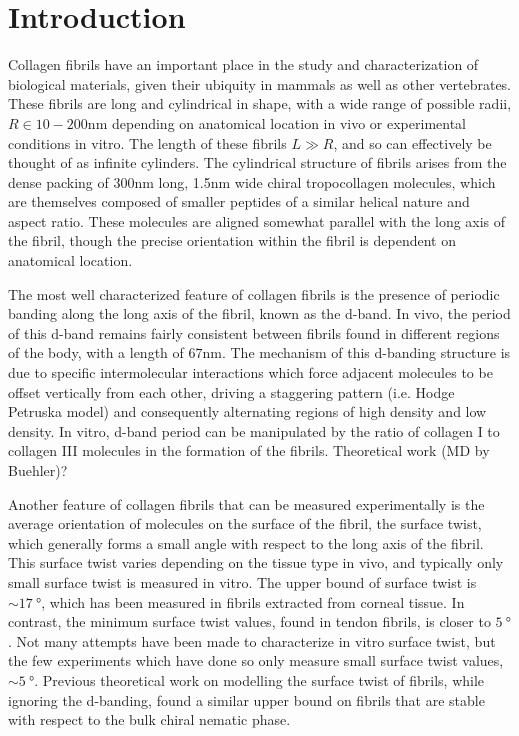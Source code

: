 \documentclass[%
 reprint,
 amsmath,amssymb,
 aps,
]{revtex4-1}
\begin{document}
\maketitle


\section{\label{sec:intro}Introduction}
Collagen fibrils have an important place in the study and characterization of biological materials, given their ubiquity in mammals as well as other vertebrates. These fibrils are long and cylindrical in shape, with a wide range of possible radii, $R\in10-200\si{\nano\meter}$ depending on anatomical location in vivo or experimental conditions in vitro. The length of these fibrils $L\gg R$, and so can effectively be thought of as infinite cylinders. The cylindrical structure of fibrils arises from the dense packing of 300nm long, 1.5nm wide chiral tropocollagen molecules, which are themselves composed of smaller peptides of a similar helical nature and aspect ratio. These molecules are aligned somewhat parallel with the long axis of the fibril, though the precise orientation within the fibril is dependent on anatomical location.

The most well characterized feature of collagen fibrils is the presence of periodic banding along the long axis of the fibril, known as the d-band. In vivo, the period of this d-band remains fairly consistent between fibrils found in different regions of the body, with a length of $67\si{\nano\meter}$. The mechanism of this d-banding structure is due to specific intermolecular interactions which force adjacent molecules to be offset vertically from each other, driving a staggering pattern (i.e. Hodge Petruska model) and consequently alternating regions of high density and low density. In vitro, d-band period can be manipulated by the ratio of collagen I to collagen III molecules in the formation of the fibrils. Theoretical work (MD by Buehler)?

Another feature of collagen fibrils that can be measured experimentally is the average orientation of molecules on the surface of the fibril, the surface twist, which generally forms a small angle with respect to the long axis of the fibril. This surface twist varies depending on the tissue type in vivo, and typically only small surface twist is measured in vitro. The upper bound of surface twist is $\sim\SI{17}{\degree}$, which has been measured in fibrils extracted from corneal tissue. In contrast, the minimum surface twist values, found in tendon fibrils, is closer to $\SI{5}{\degree}$. Not many attempts have been made to characterize in vitro surface twist, but the few experiments which have done so only measure small surface twist values, $\sim\SI{5}{\degree}$. Previous theoretical work on modelling the surface twist of fibrils, while ignoring the d-banding, found a similar upper bound on fibrils that are stable with respect to the bulk chiral nematic phase.
\end{document}
